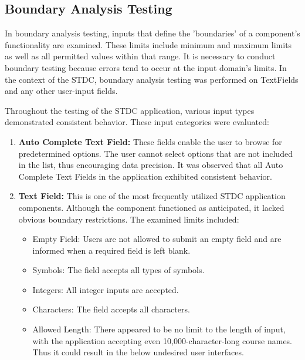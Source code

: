 \clearpage

\vspace{0.25cm}
\subsection{Boundary Analysis Testing}
\begin{justify}
    In boundary analysis testing, inputs that define the 'boundaries' of a component's functionality are examined. These limits include minimum and maximum limits as well as all permitted values within that range. It is necessary to conduct boundary testing because errors tend to occur at the input domain's limits. In the context of the STDC, boundary analysis testing was performed on TextFields and any other user-input fields.

    \vspace{0.25cm}
    \newendline Throughout the testing of the STDC application, various input types demonstrated consistent behavior. These input categories were evaluated:\\

    \begin{enumerate}
        \item \textbf{Auto Complete Text Field:} These fields enable the user to browse for predetermined options. The user cannot select options that are not included in the list, thus encouraging data precision. It was observed that all Auto Complete Text Fields in the application exhibited consistent behavior.
        
        \item \textbf{Text Field:} This is one of the most frequently utilized STDC application components. Although the component functioned as anticipated, it lacked obvious boundary restrictions. The examined limits included:

            \begin{itemize}
                \item Empty Field: Users are not allowed to submit an empty field and are informed when a required field is left blank.
                \item Symbols: The field accepts all types of symbols.
                \item Integers: All integer inputs are accepted.
                \item Characters: The field accepts all characters.
                \item Allowed Length: There appeared to be no limit to the length of input, with the application accepting even 10,000-character-long course names. Thus it could result in the below undesired user interfaces.
            \end{itemize}


\end{enumerate}
\end{justify}
